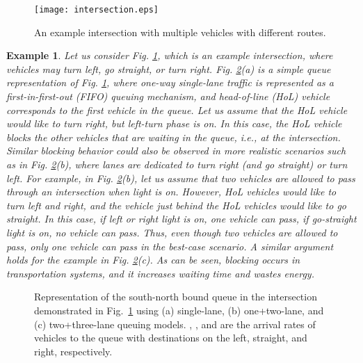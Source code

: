 \documentclass[conference]{IEEEtran}
\newcommand{\ie}{{\em i.e., }}
\newtheorem{example}{Example}
\begin{document}
\begin{figure} [t!]
\centering
\vspace{-10pt}
\texttt{[image: intersection.eps]}
\caption{An example intersection with multiple vehicles with different routes.}
\vspace{-5pt}
\label{fig:intersection}
\vspace{-15pt}
\end{figure}

\begin{example} \label{example:ex1}
Let us consider Fig. \ref{fig:intersection}, which is an example intersection, where vehicles may turn left, go straight, or turn right.
Fig. \ref{fig:queueModels}(a) is a simple queue representation of Fig. \ref{fig:intersection}, where one-way single-lane traffic is represented as a first-in-first-out (FIFO) queuing mechanism, and head-of-line (HoL) vehicle corresponds to the first vehicle in the queue. Let us assume that the HoL vehicle would like to turn right, but left-turn phase is on. In this case, the HoL vehicle blocks the other vehicles that are waiting in the queue, \ie at the intersection. Similar blocking behavior could also be observed in more realistic scenarios such as in Fig. \ref{fig:queueModels}(b), where lanes are dedicated to turn right (and go straight) or turn left. For example, in  Fig. \ref{fig:queueModels}(b), let us assume that two vehicles are allowed to pass through an intersection when light is on. However, HoL vehicles would like to turn left and right, and the vehicle just behind the HoL vehicles would like to go straight. In this case, if left or right light is on, one vehicle can pass, if go-straight light is on, no vehicle can pass. Thus, even though two vehicles are allowed to pass, only one vehicle can pass in the best-case scenario. A similar argument holds for the example in Fig. \ref{fig:queueModels}(c). As can be seen, blocking occurs in transportation systems, and it increases waiting time and wastes energy. \hfill 
\end{example}


\begin{figure}[t!]
\begin{center}
\vspace{-10pt}
 \hspace{15pt}
 \hspace{15pt}
\end{center}
\begin{center}
\vspace{-10pt}
\caption{\label{fig:queueModels} Representation of the south-north bound queue in the intersection demonstrated in Fig.~\ref{fig:intersection} using (a) single-lane, (b) one+two-lane, and (c) two+three-lane queuing models. , , and  are the arrival rates of vehicles to the queue with destinations on the left, straight, and right, respectively.}
\vspace{-25pt}
\end{center}
\end{figure}
\end{document}
